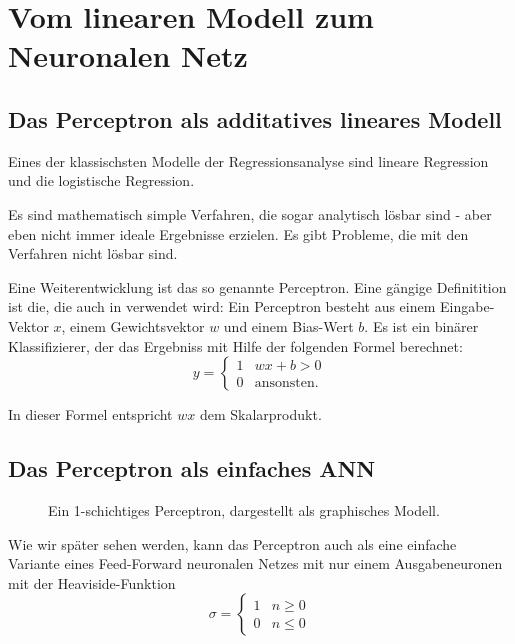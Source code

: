 ﻿\section{Vom linearen Modell zum Neuronalen Netz}

\subsection{Das Perceptron als additatives lineares Modell}
Eines der klassischsten Modelle der Regressionsanalyse sind lineare Regression und die logistische Regression. 

Es sind mathematisch simple Verfahren, die sogar analytisch lösbar sind - aber eben nicht immer ideale Ergebnisse erzielen. Es gibt Probleme, die mit den Verfahren nicht lösbar sind. 

Eine Weiterentwicklung ist das so genannte Perceptron.
Eine gängige Definitition ist die, die auch in \cite{bishop1995neural} verwendet wird: 
Ein Perceptron besteht aus einem Eingabe-Vektor $x$, einem Gewichtsvektor $w$ und einem Bias-Wert $b$. Es ist ein binärer Klassifizierer, der das Ergebniss mit Hilfe der folgenden Formel berechnet:
\begin{equation}
\label{eq:perceptron}
    y = \begin{cases}
               1               & w x + b > 0\\
               0               & \text{ansonsten}. %
           \end{cases} 
\end{equation}

In dieser Formel entspricht $wx$ dem Skalarprodukt.

\subsection{Das Perceptron als einfaches ANN}
\begin{figure}[ht!]
  \label{fig:SLP}
  \centering
    
  \caption{Ein 1-schichtiges Perceptron, dargestellt als graphisches Modell.}
\end{figure}

Wie wir später sehen werden, kann das Perceptron auch als eine einfache Variante eines Feed-Forward neuronalen Netzes mit nur einem Ausgabeneuronen mit der Heaviside-Funktion
\begin{equation}
    \sigma = \begin{cases}
               1               & n \geq 0\\
               0               & n \leq 0
           \end{cases}
\end{equation}

